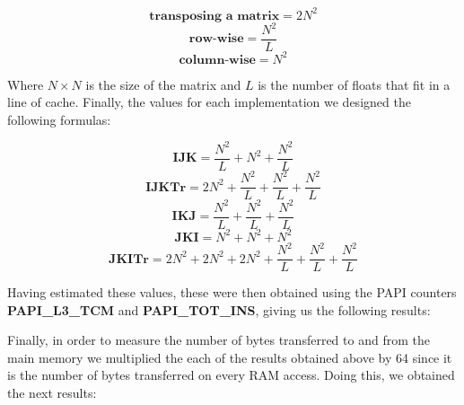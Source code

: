 \documentclass[twoside,twocolumn]{article}
\begin{document}
$$\textbf{transposing a matrix} = 2N^{2}$$
$$\textbf{row-wise} = \frac{N^{2}}{L}$$
$$\textbf{column-wise} = N^{2}$$

Where $N \times N$ is the size of the matrix and $L$ is the number of floats that fit in a line of cache. Finally, the values for each implementation we designed the following formulas:

$$\textbf{IJK} = \frac{N^{2}}{L} + N^{2} + \frac{N^{2}}{L}$$
$$\textbf{IJKTr} = 2N^{2} + \frac{N^{2}}{L} + \frac{N^{2}}{L} + \frac{N^{2}}{L}$$
$$\textbf{IKJ} = \frac{N^{2}}{L} + \frac{N^{2}}{L} + \frac{N^{2}}{L}$$
$$\textbf{JKI} = N^{2} + N^{2} + N^{2}$$
$$\textbf{JKITr} = 2N^{2} + 2N^{2} + 2N^{2} + \frac{N^{2}}{L} + \frac{N^{2}}{L} + \frac{N^{2}}{L}$$

Having estimated these values, these were then obtained using the PAPI counters \textbf{PAPI\_L3\_TCM} and \textbf{PAPI\_TOT\_INS}, giving us the following results:

\begin{table}[ht]
\caption{RAM accesses per instruction.}
\label{tab:ramresults}
\end{table}

Finally, in order to measure the number of bytes transferred to and from the main memory we multiplied the each of the results obtained above by 64 since it is the number of bytes transferred on every RAM access. Doing this, we obtained the next results:
\end{document}
